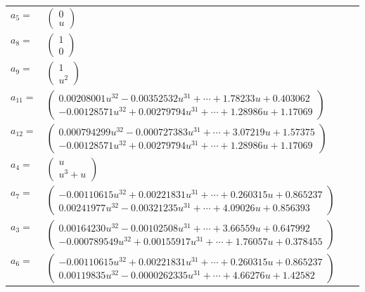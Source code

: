 \documentclass[1p]{elsarticle_modified}
\theoremstyle{definition}
\begin{document}
\begin{tabular}{m{7pt} m{180pt} m{7pt} m{180pt} }
\flushright $a_{5}=$&$\begin{pmatrix}0\\u\end{pmatrix}$ \\
\flushright $a_{8}=$&$\begin{pmatrix}1\\0\end{pmatrix}$ \\
\flushright $a_{9}=$&$\begin{pmatrix}1\\u^2\end{pmatrix}$ \\
\flushright $a_{11}=$&$\begin{pmatrix}0.00208001 u^{32}-0.00352532 u^{31}+\cdots+1.78233 u+0.403062\\-0.00128571 u^{32}+0.00279794 u^{31}+\cdots+1.28986 u+1.17069\end{pmatrix}$ \\
\flushright $a_{12}=$&$\begin{pmatrix}0.000794299 u^{32}-0.000727383 u^{31}+\cdots+3.07219 u+1.57375\\-0.00128571 u^{32}+0.00279794 u^{31}+\cdots+1.28986 u+1.17069\end{pmatrix}$ \\
\flushright $a_{4}=$&$\begin{pmatrix}u\\u^3+u\end{pmatrix}$ \\
\flushright $a_{7}=$&$\begin{pmatrix}-0.00110615 u^{32}+0.00221831 u^{31}+\cdots+0.260315 u+0.865237\\0.00241977 u^{32}-0.00321235 u^{31}+\cdots+4.09026 u+0.856393\end{pmatrix}$ \\
\flushright $a_{3}=$&$\begin{pmatrix}0.00164230 u^{32}-0.00102508 u^{31}+\cdots+3.66559 u+0.647992\\-0.000789549 u^{32}+0.00155917 u^{31}+\cdots+1.76057 u+0.378455\end{pmatrix}$ \\
\flushright $a_{6}=$&$\begin{pmatrix}-0.00110615 u^{32}+0.00221831 u^{31}+\cdots+0.260315 u+0.865237\\0.00119835 u^{32}-0.0000262335 u^{31}+\cdots+4.66276 u+1.42582\end{pmatrix}$ \\

\end{tabular}
\end{document}
